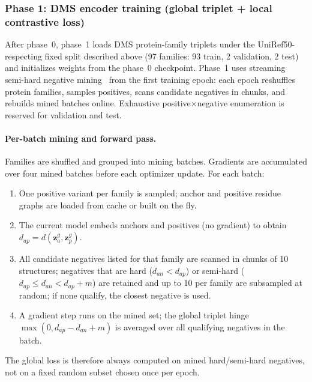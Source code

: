 \documentclass[11pt,a4paper]{article}
\begin{document}
\subsubsection{Phase 1: DMS encoder training (global triplet + local contrastive loss)}
\label{sec:phase1-dms}
After phase~0, phase~1 loads DMS protein-family triplets under the UniRef50-respecting fixed split described above (97 families: 93 train, 2 validation, 2 test) and initializes weights from the phase~0 checkpoint. Phase~1 uses streaming semi-hard negative mining~\cite{schroff2015facenet} from the first training epoch: each epoch reshuffles protein families, samples positives, scans candidate negatives in chunks, and rebuilds mined batches online. Exhaustive positive$\times$negative enumeration is reserved for validation and test.

\paragraph{Per-batch mining and forward pass.}
Families are shuffled and grouped into mining batches. Gradients are accumulated over four mined batches before each optimizer update. For each batch:
\begin{enumerate}
    \item One positive variant per family is sampled; anchor and positive residue graphs are loaded from cache or built on the fly.
    \item The current model embeds anchors and positives (no gradient) to obtain $d_{ap}=d(\mathbf{z}_a^g,\mathbf{z}_p^g)$.
    \item All candidate negatives listed for that family are scanned in chunks of 10 structures; negatives that are hard ($d_{an}<d_{ap}$) or semi-hard ($d_{ap}\le d_{an}<d_{ap}+m$) are retained and up to 10 per family are subsampled at random; if none qualify, the closest negative is used.
    \item A gradient step runs on the mined set; the global triplet hinge $\max(0, d_{ap}-d_{an}+m)$ is averaged over all qualifying negatives in the batch.
\end{enumerate}
The global loss is therefore always computed on mined hard/semi-hard negatives, not on a fixed random subset chosen once per epoch.
\end{document}
